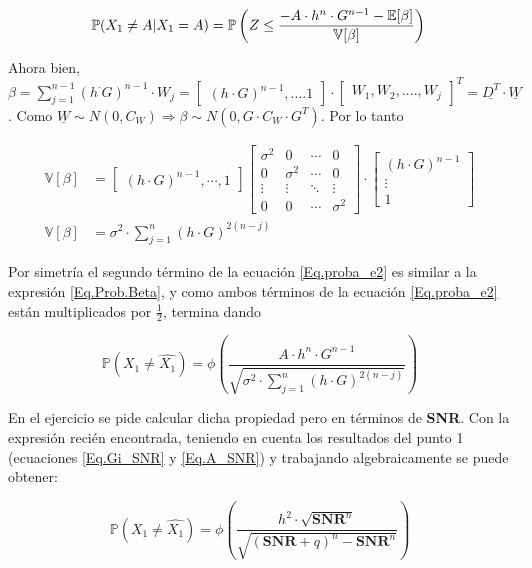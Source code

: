 			\begin{equation}
				\mathbb{P}(X_1 \neq A | X_1 = A) = \mathbb{P} \left( Z\leq \frac{-A \cdot h^n \cdot G^{n-1} - \mathbb{E}[\beta]}{\mathbb{V}[\beta]} \right)
				\label{Eq.Prob.Beta} \\
			\end{equation}

\indent Ahora bien, $\beta = \sum_{j=1}^{n-1} (h ^\cdot G)^{n-1} \cdot W_j = \begin{bmatrix} (h \cdot G)^{n-1}, .... 1 \end{bmatrix} \cdot \begin{bmatrix} W_1, W_2, ...., W_j \end{bmatrix} ^T = \underline{D^T} \cdot \underline{W}$. Como $\underline{W} \sim N(0,C_W) \Rightarrow \beta \sim N(0, G \cdot C_W \cdot G^T)$. Por lo tanto

				\begin{align*}
				\mathbb{V}[\beta] &= \begin{bmatrix} (h \cdot G)^{n-1}, \cdots ,1 \end{bmatrix} \begin{bmatrix} \sigma ^2 & 0 & \cdots & 0 \\ 0 & \sigma ^2 & \cdots & 0 \\ \vdots & \vdots & \ddots & \vdots \\ 0 & 0 & \cdots & \sigma ^2\end{bmatrix} \cdot \begin{bmatrix} (h \cdot G)^{n-1}\\ \vdots \\ 1 \end{bmatrix} \\
				\mathbb{V}[\beta] &= \sigma ^2 \cdot \sum_{j=1}^{n}(h \cdot G)^{2(n-j)}
				\end{align*}

Por simetría el segundo término de la ecuación \ref{Eq.proba_e2} es similar a la expresión \ref{Eq.Prob.Beta}, y como ambos términos de la ecuación \ref{Eq.proba_e2} están multiplicados por $\frac{1}{2}$, termina dando

				\begin{equation}
				\mathbb{P}(X_1 \neq \widehat{X_1}) = \phi \left( \frac{A \cdot h^n \cdot G^{n-1}}{\sqrt{\sigma ^2 \cdot \sum_{j=1}^{n} (h \cdot G)^{2(n-j)}}}	 \right) 
				\end{equation}		

\indent En el ejercicio se pide calcular dicha propiedad pero en términos de \textbf{SNR}. Con la expresión recién encontrada, teniendo en cuenta los resultados del punto 1 (ecuaciones \ref{Eq.Gi_SNR} y \ref{Eq.A_SNR}) y trabajando algebraicamente se puede obtener:

				\begin{equation}
					\mathbb{P}(X_1 \neq \widehat{X_1}) = \phi \left( \frac{h^2 \cdot \sqrt{\textbf{SNR}^n}}{\sqrt{(\textbf{SNR}+q)^n -\textbf{SNR}^n}} \right)
					\label{Eq.prob_SNR}					
				\end{equation} 	